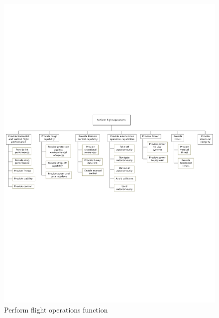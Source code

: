 \begin{figure}[htb]
\centering
\includegraphics[width=\textwidth]{./ProjectDescription/Figures/FBS-FlightOps}
\caption{Perform flight operations function}
\label{fig:FBS-FlightOps}
\end{figure}


